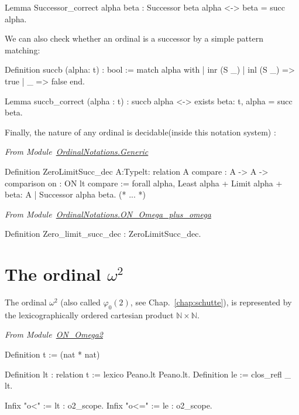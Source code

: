 \documentclass[a4paper]{book}
\begin{document}
\begin{Coqsrc}
Lemma Successor_correct alpha beta : Successor beta alpha <->
                                     beta = succ alpha.
\end{Coqsrc}

We can also check whether an ordinal is a successor by a simple pattern matching:

\begin{Coqsrc}
Definition succb (alpha: t) : bool := match alpha with
                                 | inr (S  _) | inl (S _) => true
                                 | _ => false
                                 end.

Lemma succb_correct (alpha : t) :
    succb alpha <->  exists beta: t, alpha = succ beta.
\end{Coqsrc}


Finally, the nature of any ordinal is decidable(inside this notation system) :

\noindent\emph{From Module~\href{../src/html/hydras.OrdinalNotations.Generic.html}{OrdinalNotations.Generic}}
\begin{Coqsrc}
  Definition ZeroLimitSucc_dec {A:Type}{lt: relation A}
           {compare : A -> A -> comparison}
           {on : ON lt compare} :=
  forall alpha,
    {Least alpha} +
    {Limit alpha} +
    {beta: A | Successor alpha beta}.
(* ... *)
\end{Coqsrc}

\noindent\emph{From Module~\href{../src/html/hydras.OrdinalNotations.ON_Omega_plus_omega.html}{OrdinalNotations.ON\_Omega\_plus\_omega}}

\begin{Coqsrc}
Definition Zero_limit_succ_dec : ZeroLimitSucc_dec.
\end{Coqsrc}


\section{The ordinal \texorpdfstring{$\omega^2$}{omega^2}}

The ordinal $\omega^2$ (also called $\varphi_0(2)$, see Chap.~\ref{chap:schutte}), is represented by the lexicographically ordered cartesian product $\mathbb{N}\times\mathbb{N}$. 

\vspace{4pt}
\noindent\emph{From Module~\href{../src/html/hydras.OrdinalNotations.ON_Omega2.html}{ON\_Omega2}}

\begin{Coqsrc}
Definition t := (nat * nat)%

Definition lt : relation t := lexico Peano.lt Peano.lt.
Definition le := clos_refl _ lt.

Infix "o<" := lt : o2_scope.
Infix "o<=" := le : o2_scope.
\end{Coqsrc}
\end{document}
